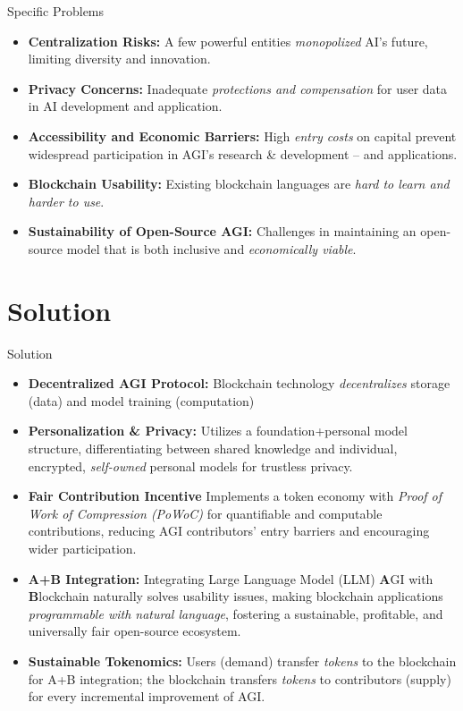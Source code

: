\documentclass{beamer}
\begin{document}
\begin{frame}{Specific Problems}
\begin{itemize}
    \item \textbf{Centralization Risks: } A few powerful entities \emph{monopolized} AI's future, limiting diversity and innovation.
	\item \textbf{Privacy Concerns: } Inadequate \emph{protections and compensation} for user data in AI development and application.
	\item \textbf{Accessibility and Economic Barriers: } High \emph{entry costs} on capital prevent widespread participation in AGI's research \& development -- and applications.
	\item \textbf{Blockchain Usability: } Existing blockchain languages are \emph{hard to learn and harder to use}.
	\item \textbf{Sustainability of Open-Source AGI: } Challenges in maintaining an open-source model that is both inclusive and \emph{economically viable}.
\end{itemize}
\end{frame}

\section{Solution}
\begin{frame}{Solution}
\begin{itemize}
    \item \textbf{Decentralized AGI Protocol: } {\footnotesize Blockchain technology \emph{decentralizes} storage (data) and model training (computation)}
    \item \textbf{Personalization \& Privacy: } {\footnotesize Utilizes a foundation+personal model structure, differentiating between shared knowledge and individual, encrypted, \emph{self-owned} personal models for trustless privacy.}
    \item \textbf{Fair Contribution Incentive} {\footnotesize Implements a token economy with \emph{Proof of Work of Compression (PoWoC)} for quantifiable and computable contributions, reducing AGI contributors' entry barriers and encouraging wider participation.}
    \item \textbf{A+B Integration: } {\footnotesize Integrating Large Language Model (LLM) \textbf{A}GI with \textbf{B}lockchain naturally solves usability issues, making blockchain applications \emph{programmable with natural language}, fostering a sustainable, profitable, and universally fair open-source ecosystem.}
    \item \textbf{Sustainable Tokenomics: } {\footnotesize Users (demand) transfer \emph{tokens} to the blockchain for A+B integration; the blockchain transfers \emph{tokens} to contributors (supply) for every incremental improvement of AGI.}
\end{itemize}
\end{frame}
\end{document}
